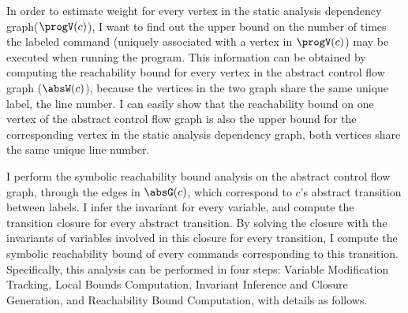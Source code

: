 {In order to estimate weight for every vertex in the static analysis dependency graph($\progV(c)$), I want to find out the upper bound on 
the number of times the labeled command (uniquely associated with a vertex in $\progV(c)$) may be executed when running the program.
This information can be obtained by computing the reachability bound for every vertex in the abstract control flow graph ($\absW(c)$), because
the vertices in the two graph share the same unique label, the line number.  I can easily show that the reachability bound on one vertex of the abstract control flow graph is also the upper bound for the corresponding vertex in the static analysis dependency graph, both vertices share the same unique line number.}


 I perform the symbolic reachability bound analysis on the abstract control flow graph, 
through the edges in $\absG(c)$, which correspond to $c$'s abstract transition between labels.
 I infer the invariant for every variable, and compute the transition closure for every abstract transition. By solving the closure
with the invariants of variables involved in this closure for every transition, I compute
the symbolic reachability bound of every commands corresponding to this transition. Specifically, this analysis can be performed in four steps:
 Variable Modification Tracking, Local Bounds Computation,
Invariant Inference and Closure Generation, and Reachability Bound Computation,
% 
with details as follows.
%
%
